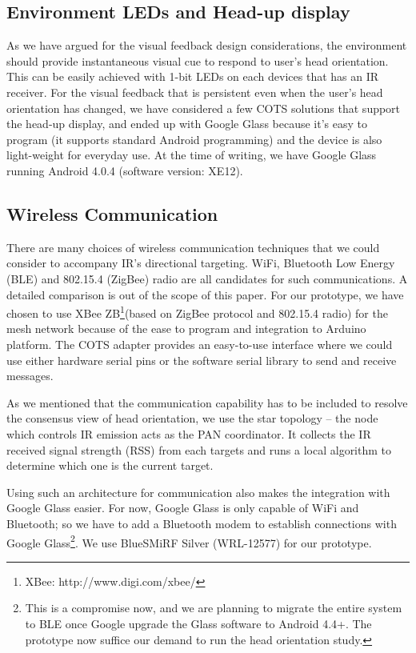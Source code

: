 \subsection{Environment LEDs and Head-up display}
\label{sec:head-up-display}
As we have argued for the visual feedback design considerations, the environment should provide instantaneous visual cue to respond to user's head orientation. This can be easily achieved with 1-bit LEDs on each devices that has an IR receiver. For the visual feedback that is persistent even when the user's head orientation has changed, we have considered a few COTS solutions that support the head-up display, and ended up with Google Glass because it's easy to program (it supports standard Android programming) and the device is also light-weight for everyday use. At the time of writing, we have Google Glass running Android 4.0.4 (software version: XE12). 

\subsection{Wireless Communication}
\label{sec:wirel-comm}

There are many choices of wireless communication techniques that we could consider to accompany IR's directional targeting. WiFi, Bluetooth Low Energy (BLE) and 802.15.4 (ZigBee) radio are all candidates for such communications. A detailed comparison is out of the scope of this paper. For our prototype, we have chosen to use XBee ZB\footnote{XBee: http://www.digi.com/xbee/}(based on ZigBee protocol and 802.15.4 radio) for the mesh network because of the ease to program and integration to Arduino platform. The COTS adapter provides an easy-to-use interface where we could use either hardware serial pins or the software serial library to send and receive messages. 

As we mentioned that the communication capability has to be included to resolve the consensus view of head orientation, we use the star topology -- the node which controls IR emission acts as the PAN coordinator. It collects the IR received signal strength (RSS) from each targets and runs a local algorithm to determine which one is the current target. 

Using such an architecture for communication also makes the integration with Google Glass easier. For now, Google Glass is only capable of WiFi and Bluetooth; so we have to add a Bluetooth modem to establish connections with Google Glass\footnote{This is a compromise now, and we are planning to migrate the entire system to BLE once Google upgrade the Glass software to Android 4.4+. The prototype now suffice our demand to run the head orientation study.}. We use BlueSMiRF Silver (WRL-12577) for our prototype. 

